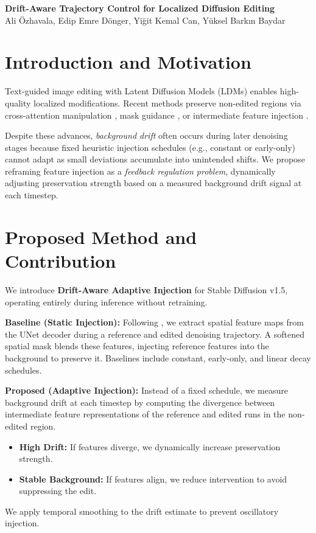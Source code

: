\documentclass[11pt]{article}
\begin{document}
\begin{center}
    \Large \textbf{Drift-Aware Trajectory Control for Localized Diffusion Editing} \\[1\baselineskip]
    \normalsize Ali Özhavala, Edip Emre Dönger, Yiğit Kemal Can, Yüksel Barkın Baydar
\end{center}



\section{Introduction and Motivation}
Text-guided image editing with Latent Diffusion Models (LDMs) \cite{rombach2022high} enables high-quality localized modifications. Recent methods preserve non-edited regions via cross-attention manipulation \cite{hertz2022prompt}, mask guidance \cite{couairon2023diffedit}, or intermediate feature injection \cite{tumanyan2023plug, cao2023masactrl}. 

Despite these advances, \textit{background drift} often occurs during later denoising stages because fixed heuristic injection schedules (e.g., constant or early-only) cannot adapt as small deviations accumulate into unintended shifts. We propose reframing feature injection as a \textit{feedback regulation problem}, dynamically adjusting preservation strength based on a measured background drift signal at each timestep.

\section{Proposed Method and Contribution}
We introduce \textbf{Drift-Aware Adaptive Injection} for Stable Diffusion v1.5, operating entirely during inference without retraining.

\textbf{Baseline (Static Injection):} Following \cite{tumanyan2023plug}, we extract spatial feature maps from the UNet decoder during a reference and edited denoising trajectory. A softened spatial mask blends these features, injecting reference features into the background to preserve it. Baselines include constant, early-only, and linear decay schedules.

\textbf{Proposed (Adaptive Injection):} Instead of a fixed schedule, we measure background drift at each timestep by computing the divergence between intermediate feature representations of the reference and edited runs in the non-edited region. 
\begin{itemize}[noitemsep, topsep=2pt, leftmargin=*]
    \item \textbf{High Drift:} If features diverge, we dynamically increase preservation strength.
    \item \textbf{Stable Background:} If features align, we reduce intervention to avoid suppressing the edit.
\end{itemize}
We apply temporal smoothing to the drift estimate to prevent oscillatory injection. 
\end{document}

